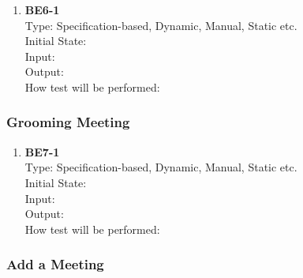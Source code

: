 \documentclass[12pt, titlepage]{article}
\begin{document}
\begin{enumerate}
    \item{\textbf{BE6-1}}\\
    Type: Specification-based, Dynamic, Manual, Static etc.\\
    Initial State: \\
    Input: \\
    Output: \\
    How test will be performed: \\
\end{enumerate}

\subsubsection{Grooming Meeting}

\begin{enumerate}
    \item{\textbf{BE7-1}}\\
    Type: Specification-based, Dynamic, Manual, Static etc.\\
    Initial State: \\
    Input: \\
    Output: \\
    How test will be performed: \\
\end{enumerate}

\subsubsection{Add a Meeting}
\end{document}
